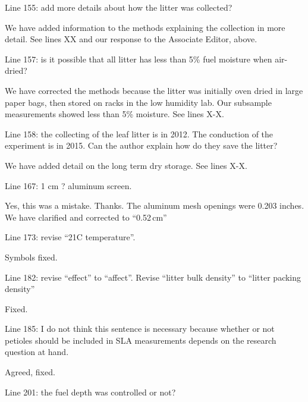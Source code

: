 \documentclass[letterpaper, 12pt]{letter}
\begin{document}
\begin{letter}{}
\begin{quoting}
  Line 155: add more details about how the litter was collected?
\end{quoting}

We have added information to the methods explaining the collection in more
detail. See lines XX and our response to the Associate Editor, above.

\begin{quoting}
  Line 157: is it possible that all litter has less than 5\% fuel moisture when
  air-dried?
\end{quoting}

We have corrected the methods because the litter was initially oven dried in
large paper bags, then stored on racks in the low humidity lab. Our subsample
measurements showed less than 5\% moisture. See lines X-X.

\begin{quoting}
  Line 158: the collecting of the leaf litter is in 2012. The conduction of the
  experiment is in 2015. Can the author explain how do they save the litter?
\end{quoting}

We have added detail on the long term dry storage. See lines X-X.

\begin{quoting}
Line 167: 1 cm ? aluminum screen.
\end{quoting}

Yes, this was a mistake. Thanks. The aluminum mesh openings were 0.203 inches.
We have clarified and corrected to ``0.52\,cm''

\begin{quoting}
  Line 173: revise “21C temperature”.
\end{quoting}

Symbols fixed.

\begin{quoting}
  Line 182: revise “effect” to “affect”. Revise “litter bulk density” to
  “litter packing density”
\end{quoting}

Fixed.

\begin{quoting}
  Line 185: I do not think this sentence is necessary because whether or not
  petioles should be included in SLA measurements depends on the research
  question at hand.
\end{quoting}

Agreed, fixed.

\begin{quoting}
  Line 201: the fuel depth was controlled or not?
\end{quoting}


\end{letter}
\end{document}
